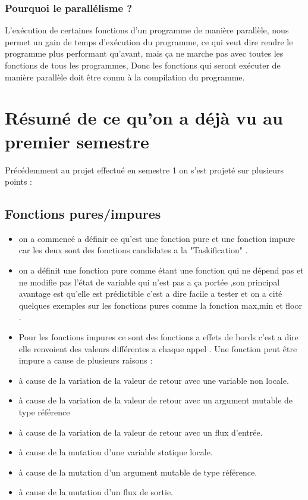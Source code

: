 \documentclass[12pt,titlepage]{article}
\begin{document}
\subsubsection{Pourquoi le parallélisme ?}

 L’exécution de  certaines fonctions d'un programme de manière parallèle, nous permet un gain de temps d'exécution du programme, ce qui veut dire rendre le programme plus performant qu'avant, mais ça ne marche pas avec toutes  les fonctions de tous les programmes, Donc  les fonctions qui seront exécuter de manière parallèle doit être connu à la compilation du programme.
\section{Résumé de ce qu'on a déjà vu au premier semestre  }
Précédemment au projet effectué en semestre 1 on s'est projeté sur plusieurs points : 
\subsection{Fonctions pures/impures}
\begin{itemize}
    \item on a commencé a définir ce qu'est une fonction pure et une fonction impure car les deux sont des fonctions candidates a la "Taskification" .
    \item on a définit une fonction pure comme étant une fonction qui ne dépend pas et ne modifie pas l'état de variable qui n'est pas a ça portée ,son principal avantage est qu'elle est prédictible c'est a dire facile a tester  et on a cité quelques exemples sur les fonctions pures comme la fonction max,min et floor .
    \item Pour les fonctions impures ce sont des fonctions a effets de bords c'est a dire elle renvoient des valeurs différentes a chaque appel . Une fonction peut être impure a cause de plusieurs raisons :
    \item à cause de la variation de la valeur de retour avec une variable non locale.
    \item à cause de la variation de la valeur de retour avec un argument mutable de type référence
    \item à cause de la variation de la valeur de retour avec un flux d’entrée.
    \item à cause de la mutation d’une variable statique locale.
    \item à cause de la mutation d’un argument mutable de type référence.
    \item à cause de la mutation d’un flux de sortie.
\end{itemize}
\end{document}
